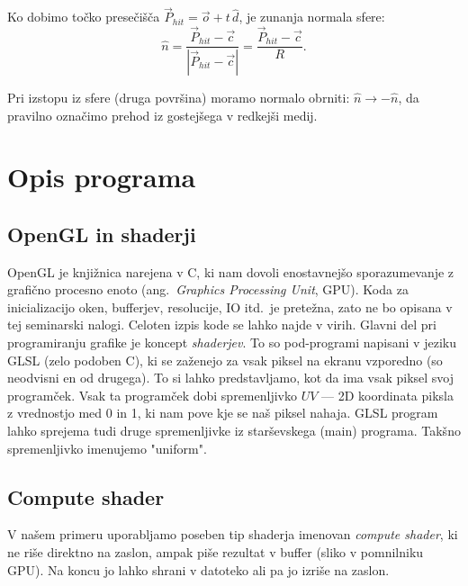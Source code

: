 \documentclass[a4paper,12pt]{article}
\begin{document}
    Ko dobimo točko presečišča $\vec{P}_{hit} = \vec{o} + t\,\hat{d}$, je zunanja normala sfere:
    \begin{equation}
        \hat{n} = \frac{\vec{P}_{hit} - \vec{c}}{|\vec{P}_{hit} - \vec{c}|} = \frac{\vec{P}_{hit} - \vec{c}}{R}.
    \end{equation}

    Pri izstopu iz sfere (druga površina) moramo normalo obrniti: $\hat{n} \to -\hat{n}$, da pravilno
    označimo prehod iz gostejšega v redkejši medij.

    \section{Opis programa}

    \subsection{OpenGL in shaderji}

    OpenGL je knjižnica narejena v C, ki nam dovoli enostavnejšo sporazumevanje z grafično procesno enoto
    (ang.\ \emph{Graphics Processing Unit}, GPU).
    Koda za inicializacijo oken, bufferjev, resolucije, IO itd.\ je pretežna, zato ne bo opisana v tej seminarski nalogi.
    Celoten izpis kode se lahko najde v virih.
    Glavni del pri programiranju grafike je koncept \emph{shaderjev}.
    To so pod-programi napisani v jeziku GLSL (zelo podoben C), ki se zaženejo za vsak piksel na ekranu vzporedno (so neodvisni en od drugega).
    To si lahko predstavljamo, kot da ima vsak piksel svoj programček.
    Vsak ta programček dobi spremenljivko $UV$ — 2D koordinata piksla z vrednostjo med 0 in 1, ki nam pove kje se naš piksel nahaja.
    GLSL program lahko sprejema tudi druge spremenljivke iz starševskega (main) programa.
    Takšno spremenljivko imenujemo "uniform".

    \subsection{Compute shader}

    V našem primeru uporabljamo poseben tip shaderja imenovan \emph{compute shader}, ki ne riše direktno na zaslon,
    ampak piše rezultat v buffer (sliko v pomnilniku GPU).
    Na koncu jo lahko shrani v datoteko ali pa jo izriše na zaslon.
\end{document}
